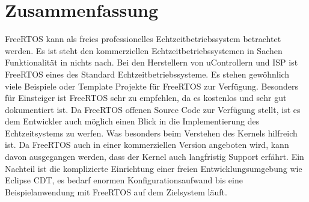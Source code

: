 \section{Zusammenfassung}
FreeRTOS kann als freies professionelles Echtzeitbetriebssystem betrachtet werden. Es ist steht den kommerziellen Echtzeitbetriebssystemen in Sachen Funktionalität in nichts nach. Bei den Herstellern von uControllern und ISP ist FreeRTOS eines des Standard Echtzeitbetriebssysteme. Es stehen gewöhnlich viele Beispiele oder Template Projekte für FreeRTOS zur Verfügung.  Besonders für Einsteiger ist FreeRTOS sehr zu empfehlen, da es kostenlos und sehr gut dokumentiert ist. Da FreeRTOS offenen Source Code zur Verfügung stellt, ist es dem Entwickler auch möglich einen Blick in die Implementierung des Echtzeitsystems zu werfen. Was besonders beim Verstehen des Kernels hilfreich ist. Da FreeRTOS auch in einer kommerziellen Version angeboten wird, kann davon ausgegangen werden, dass der Kernel auch langfristig Support erfährt. Ein Nachteil ist die komplizierte Einrichtung einer freien Entwicklungsumgebung wie Eclipse CDT, es bedarf enormen Konfigurationsaufwand bis eine Beispielanwendung mit FreeRTOS auf dem Zielsystem läuft.     